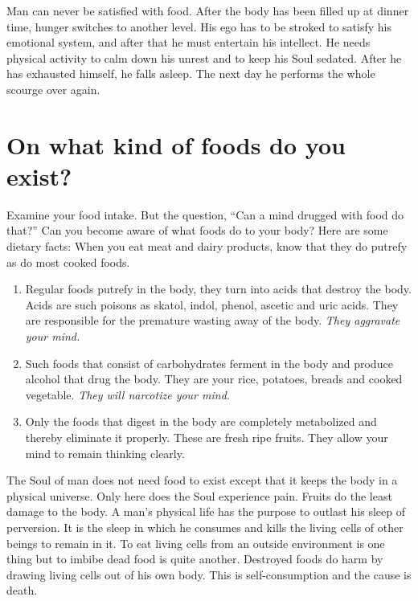 \documentclass[landscape,twocolumn,letterpaper]{article}
\begin{document}
Man can never be satisfied with food. After the body has been filled
up at dinner time, hunger switches to another level. His ego has to be
stroked to satisfy his emotional system, and after that he must
entertain his intellect.  He needs physical activity to calm down his
unrest and to keep his Soul sedated. After he has exhausted himself,
he falls asleep. The next day he performs the whole scourge over
again.





\section{On what kind of foods do you exist?}

Examine your food intake. But the question, ``Can a mind drugged with
food do that?'' Can you become aware of what foods do to your body? 
Here are some dietary facts: When you eat meat and dairy products,
know that they do putrefy as do most cooked foods.
\begin{enumerate}
\item Regular foods putrefy in the body, they turn into acids that
destroy the body. Acids are such poisons as skatol, indol, phenol,
ascetic and uric acids. They are responsible for the premature wasting
away of the body. \emph{They aggravate your mind.}
  
\item Such foods that consist of carbohydrates ferment in the body and
produce alcohol that drug the body. They are your rice, potatoes,
breads and cooked vegetable. \emph{They will narcotize your mind.}
  
\item Only the foods that digest in the body are completely
metabolized and thereby eliminate it properly. These are fresh ripe
fruits. They allow your mind to remain thinking clearly.
\end{enumerate} The Soul of man does not need food to exist except
that it keeps the body in a physical universe. Only here does the Soul
experience pain. Fruits do the least damage to the body. A man's
physical life has the purpose to outlast his sleep of perversion. It
is the sleep in which he consumes and kills the living cells of other
beings to remain in it. To eat living cells from an outside
environment is one thing but to imbibe dead food is quite
another. Destroyed foods do harm by drawing living cells out of his
own body. This is self-consumption and the cause is death.
\end{document}

